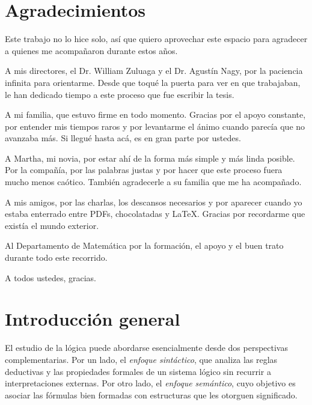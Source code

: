 \documentclass[12pt]{book}
\begin{document}
\chapter*{Agradecimientos}

Este trabajo no lo hice solo, así que quiero aprovechar este espacio para agradecer a quienes me acompañaron durante estos años.
\vspace{0.2cm}

A mis directores, el Dr. William Zuluaga y el Dr. Agustín Nagy, por la paciencia infinita para orientarme. Desde que toqué la puerta para ver en que trabajaban, le han dedicado tiempo a este proceso que fue escribir la tesis.
\vspace{0.2cm}

A mi familia, que estuvo firme en todo momento. Gracias por el apoyo constante, por entender mis tiempos raros y por levantarme el ánimo cuando parecía que no avanzaba más. Si llegué hasta acá, es en gran parte por ustedes.
\vspace{0.2cm}

A Martha, mi novia, por estar ahí de la forma más simple y más linda posible. Por la compañía, por las palabras justas y por hacer que este proceso fuera mucho menos caótico. También agradecerle a su familia que me ha acompañado. 
\vspace{0.2cm}

A mis amigos, por las charlas, los descansos necesarios y por aparecer cuando yo estaba enterrado entre PDFs, chocolatadas y LaTeX. Gracias por recordarme que existía el mundo exterior.
\vspace{0.2cm}


Al Departamento de Matemática por la formación, el apoyo y el buen trato durante todo este recorrido.
\vspace{0.2cm}

A todos ustedes, gracias.


\tableofcontents


\chapter*{Introducción general}


El estudio de la lógica puede abordarse esencialmente desde dos perspectivas complementarias. Por un lado, el \emph{enfoque sintáctico}, que analiza las reglas deductivas y las propiedades formales de un sistema lógico sin recurrir a interpretaciones externas. Por otro lado, el \emph{enfoque semántico}, cuyo objetivo es asociar las fórmulas bien formadas con estructuras que les otorguen significado.
\vspace{0.2cm}
\end{document}
